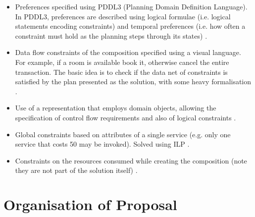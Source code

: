 \begin{itemize}
 \item Preferences specified using PDDL3 (Planning Domain Definition Language). In PDDL3, preferences are described using logical formulae (i.e. logical statements encoding constraints) and temporal preferences (i.e. how often a constraint must hold as the planning steps through its states) \cite{lin2008web}.
 \item Data flow constraints of the composition specified using a visual language. For example, if a room is available book it, otherwise cancel the entire transaction. The basic idea is to check if the data net of constraints is satisfied by the plan presented as the solution, with some heavy formalisation \cite{marconi2006specifying}.
 \item Use of a representation that employs domain objects, allowing the specification of control flow requirements and also of logical constraints \cite{bertoli2009control}.
 \item Global constraints based on attributes of a single service (e.g. only one service that costs 50 may be invoked). Solved using ILP \cite{yoo2008web}.
 \item Constraints on the resources consumed while creating the composition (note they are not part of the solution itself) \cite{xiang2011qos}.
\end{itemize}


\section{Organisation of Proposal}